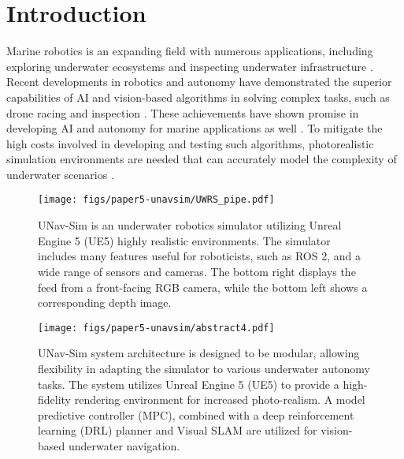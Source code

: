 \section{Introduction}\label{sec:intro}
Marine robotics is an expanding field with numerous applications, including exploring underwater ecosystems and inspecting underwater infrastructure \cite{applications}. Recent developments in robotics and autonomy have demonstrated the superior capabilities of \ac{AI} and vision-based algorithms in solving complex tasks, such as drone racing \cite{DRL_erdal,gatenet} and inspection \cite{mohit}. These achievements have shown promise in developing \ac{AI} and autonomy for marine applications as well \cite{DFKI}. To mitigate the high costs involved in developing and testing such algorithms, photorealistic simulation environments are needed that can accurately model the complexity of underwater scenarios \cite{dataset:mimir}.



\begin{figure}[t]
    \centering
    \texttt{[image: figs/paper5-unavsim/UWRS\_pipe.pdf]}
    \caption[Cover photo showcasing the Unav-Sim simulator]{UNav-Sim is an underwater robotics simulator utilizing Unreal Engine 5 (UE5) highly realistic environments. The simulator includes many features useful for roboticists, such as ROS 2, and a wide range of sensors and cameras. The bottom right displays the feed from a front-facing RGB camera, while the bottom left shows a corresponding depth image.}
    \label{fig:uwrs}
\end{figure}



\begin{figure*}[!t]
    \centering
    \texttt{[image: figs/paper5-unavsim/abstract4.pdf]}
    \caption[UNav-Sim system architecture]{UNav-Sim system architecture is designed to be modular, allowing flexibility in adapting the simulator to various underwater autonomy tasks. The system utilizes Unreal Engine 5 (UE5) to provide a high-fidelity rendering environment for increased photo-realism.  A model predictive controller (MPC), combined with a deep reinforcement learning (DRL) planner and Visual \ac{SLAM} are utilized for vision-based underwater navigation.   }
    \label{fig:abstract} 
\end{figure*}


